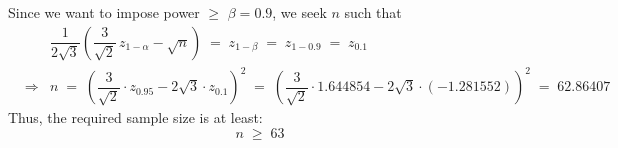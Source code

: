 Since we want to impose power $\geq$ $\beta = 0.9$, we seek $n$ such that
\begin{eqnarray*}
&& \dfrac{1}{2\sqrt{3}}\left(\dfrac{3}{\sqrt{2}}\,z_{1-\alpha} - \sqrt{n}\right)
\; = \; z_{1-\beta} \;=\; z_{1-0.9} \;=\; z_{0.1}
\\
&\Longrightarrow&
n \;=\; \left(\dfrac{3}{\sqrt{2}}\cdot z_{0.95} - 2\sqrt{3}\cdot z_{0.1}\right)^{2}
\;=\; \left(\dfrac{3}{\sqrt{2}}\cdot 1.644854 - 2\sqrt{3}\cdot (-1.281552)\right)^{2}
\;=\; 62.86407
\end{eqnarray*}
Thus, the required sample size is at least:
\begin{equation*}
n \;\geq\; 63
\end{equation*}



